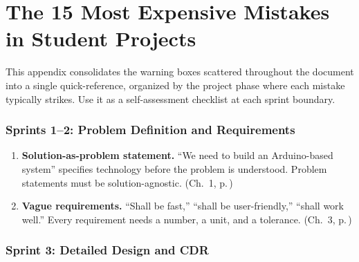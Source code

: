 \documentclass[11pt,letterpaper,twoside,openany]{book}
\begin{document}
\chapter*{The 15 Most Expensive Mistakes in Student Projects}

This appendix consolidates the warning boxes scattered throughout the document into a single quick-reference, organized by the project phase where each mistake typically strikes. Use it as a self-assessment checklist at each sprint boundary.

\subsection*{Sprints 1--2: Problem Definition and Requirements}

\begin{enumerate}[leftmargin=1.5em]

\item \textbf{Solution-as-problem statement.} ``We need to build an Arduino-based system'' specifies technology before the problem is understood. Problem statements must be solution-agnostic. (Ch.~1, p.\,\pageref{ch:problem})

\item \textbf{Vague requirements.} ``Shall be fast,'' ``shall be user-friendly,'' ``shall work well.'' Every requirement needs a number, a unit, and a tolerance. (Ch.~3, p.\,\pageref{ch:requirements})

\end{enumerate}

\subsection*{Sprint 3: Detailed Design and CDR}
\end{document}
